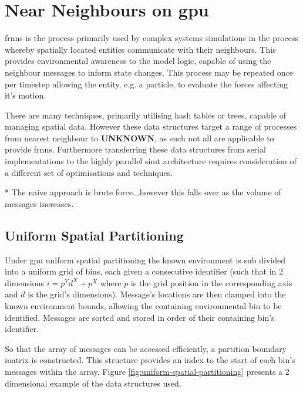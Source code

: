 \section{Near Neighbours on \gls{gpu}\label{sec:spatial-partitioning}}

\gls{frnns} is the process primarily used by complex systems simulations in the process whereby spatially located entities communicate with their neighbours. This provides environmental awareness to the model logic, capable of using the neighbour messages to inform state changes. This process may be repeated once per timestep allowing the entity, e.g. a particle, to evaluate the forces affecting it's motion.

There are many techniques, primarily utilising hash tables or trees, capable of managing spatial data. However these data structures target a range of processes from nearest neighbour to \textbf{UNKNOWN}, as such not all are applicable to provide \gls{frnns}. Furthermore transferring these data structures from serial implementations to the highly parallel \gls{simt} architecture requires consideration of a different set of optimisations and techniques.


* The naive approach is brute force...however this falls over as the volume of messages increases.

\subsection{Uniform Spatial Partitioning}
Under \gls{gpu} uniform spatial partitioning the known environment is sub divided into a uniform grid of bins, each given a consecutive identifier (such that in 2 dimensions $i = p^{Y}d^{X}+p^{X}$ where $p$ is the grid position in the corresponding axis and $d$ is the grid's dimensions). Message's locations are then clamped into the known environment bounds, allowing the containing environmental bin to be identified. Messages are sorted and stored in order of their containing bin's identifier.

So that the array of messages can be accessed efficiently, a partition boundary matrix is constructed. This structure provides an index to the start of each bin's messages within the array. Figure \ref{fig:uniform-spatial-partitioning} presents a 2 dimensional example of the data structures used.

